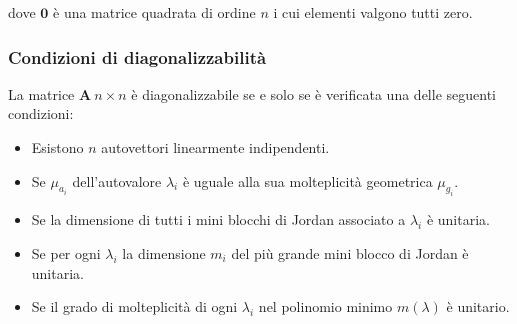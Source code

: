 \documentclass[a4paper]{article}
\renewcommand{\vec}{\bm}
\theoremstyle{definition}
\begin{document}
	 			dove $ \vec{0} $ è una matrice quadrata di ordine $ n $ i cui elementi valgono tutti zero.
 			
 			\subsubsection{Condizioni di diagonalizzabilità}
	 			La matrice $ \vec{A}\ n\times n $ è diagonalizzabile se e solo se è verificata una delle seguenti condizioni:
	 			\begin{itemize}
	 				\item Esistono $ n $ autovettori linearmente indipendenti.
	 				\item Se $ \mu_{a_i} $ dell'autovalore $ \lambda_i $ è uguale alla sua molteplicità geometrica $ \mu_{g_i} $.
	 				\item Se la dimensione di tutti i mini blocchi di Jordan associato a $ \lambda_i $ è unitaria.
	 				\item Se per ogni $ \lambda_i $ la dimensione $ m_i $ del più grande mini blocco di Jordan è unitaria.
	 				\item Se il grado di molteplicità di ogni $ \lambda_i $ nel polinomio minimo $ m(\lambda) $ è unitario.
	 			\end{itemize}
	 			
	 		
			
			
\end{document}
